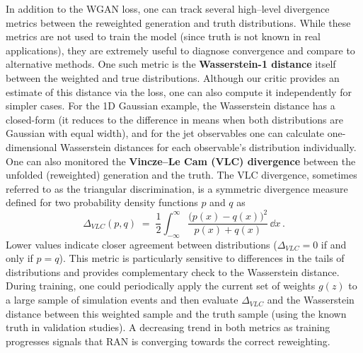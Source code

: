         In addition to the WGAN loss, one can track several high--level divergence metrics between the reweighted generation and truth distributions.
        While these metrics are not used to train the model (since truth is not known in real applications), they are extremely useful to diagnose convergence and compare to alternative methods.
        One such metric is the \textbf{Wasserstein-1 distance} itself between the weighted and true distributions.
        Although our critic provides an estimate of this distance via the loss, one can also compute it independently for simpler cases.
        For the 1D Gaussian example, the Wasserstein distance has a closed-form (it reduces to the difference in means when both distributions are Gaussian with equal width), and for the jet observables one can calculate one-dimensional Wasserstein distances for each observable’s distribution individually.
        One can also monitored the \textbf{Vincze–Le Cam (VLC) divergence}  between the unfolded (reweighted) generation and the truth.
        The VLC divergence, sometimes referred to as the triangular discrimination, is a symmetric divergence measure defined for two probability density functions $p$ and $q$ as
        \[
            \Delta_{VLC}(p,q) \;=\; \frac{1}{2}\int_{-\infty}^{\infty}\frac{\big(p(x)-q(x)\big)^2}{\,p(x)+q(x)\,}\,\dd x\,.
        \]
        Lower values indicate closer agreement between distributions ($\Delta_{VLC}=0$ if and only if $p=q$).
        This metric is particularly sensitive to differences in the tails of distributions and provides complementary check to the Wasserstein distance.
        During training, one could periodically apply the current set of weights $g(z)$ to a large sample of simulation events and then evaluate $\Delta_{VLC}$ and the Wasserstein distance between this weighted sample and the truth sample (using the known truth in validation studies).
        A decreasing trend in both metrics as training progresses signals that RAN is converging towards the correct reweighting.
        
